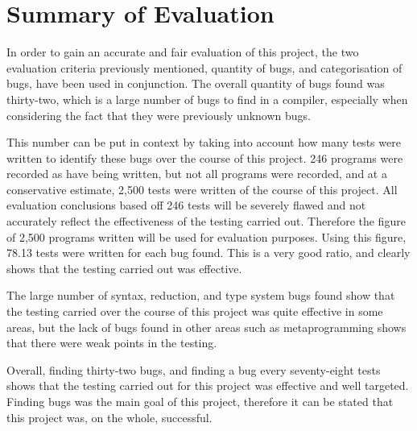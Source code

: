 \section{Summary of Evaluation}

In order to gain an accurate and fair evaluation of this project, the two evaluation criteria previously mentioned, quantity of bugs, and categorisation of bugs, have been used in conjunction. The overall quantity of bugs found was thirty-two, which is a large number of bugs to find in a compiler, especially when considering the fact that they were previously unknown bugs. 

This number can be put in context by taking into account how many tests were written to identify these bugs over the course of this project. 246 programs were recorded as have being written, but not all programs were recorded, and at a conservative estimate, 2,500 tests were written of the course of this project. All evaluation conclusions based off 246 tests will be severely flawed and not accurately reflect the effectiveness of the testing carried out. Therefore the figure of 2,500 programs written will be used for evaluation purposes. Using this figure, 78.13 tests were written for each bug found. This is a very good ratio, and clearly shows that the testing carried out was effective.

The large number of syntax, reduction, and type system bugs found show that the testing carried over the course of this project was quite effective in some areas, but the lack of bugs found in other areas such as metaprogramming shows that there were weak points in the testing.

Overall, finding thirty-two bugs, and finding a bug every seventy-eight tests shows that the testing carried out for this project was effective and well targeted. Finding bugs was the main goal of this project, therefore it can be stated that this project was, on the whole, successful.
